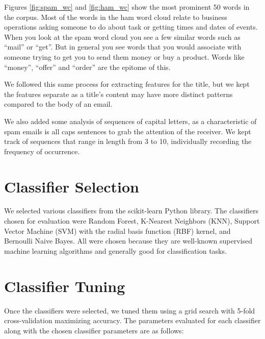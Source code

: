 \documentclass[12pt]{article}
\begin{document}
\begin{multicols}{2}
\begin{minipage}{0.48\columnwidth}
                \label{fig:ham_wc}
             \end{minipage}

             Figures \ref{fig:spam_wc} and \ref{fig:ham_wc} show
             the most prominent 50 words in the corpus. Most of the words in the
             ham word cloud relate to business operations asking someone to do about
             task or getting times and dates of events. When you look at the spam
             word cloud you see a few similar words such as ``mail'' or ``get''.
             But in general you see words that you would associate with someone trying
             to get you to send them money or buy a product. Words like ``money'',
             ``offer'' and ``order'' are the epitome of this.

             We followed this same process for extracting features for the title, but
             we kept the features separate as a title's content may have more distinct
             patterns compared to the body of an email.

             We also added some analysis of sequences of capital letters, as a characteristic
             of spam emails is all caps sentences to grab the attention of the receiver. We
             kept track of sequences that range in length from 3 to 10, individually recording
             the frequency of occurrence.
        
        \section{Classifier Selection}
        
            We selected various classifiers from the scikit-learn Python library. The 
            classifiers chosen for evaluation were Random Forest, K-Nearest Neighbors (KNN), 
            Support Vector Machine (SVM) with the radial basis function (RBF) kernel, and Bernoulli 
            Naive Bayes. All were chosen because they are well-known supervised machine learning 
            algorithms and generally good for classification tasks. 
        
        \section{Classifier Tuning}
            Once the classifiers were selected, we tuned them using a grid search with 5-fold 
            cross-validation maximizing accuracy. The parameters evaluated for each classifier along 
            with the chosen classifier parameters are as follows:
            

\end{multicols}
\end{document}
